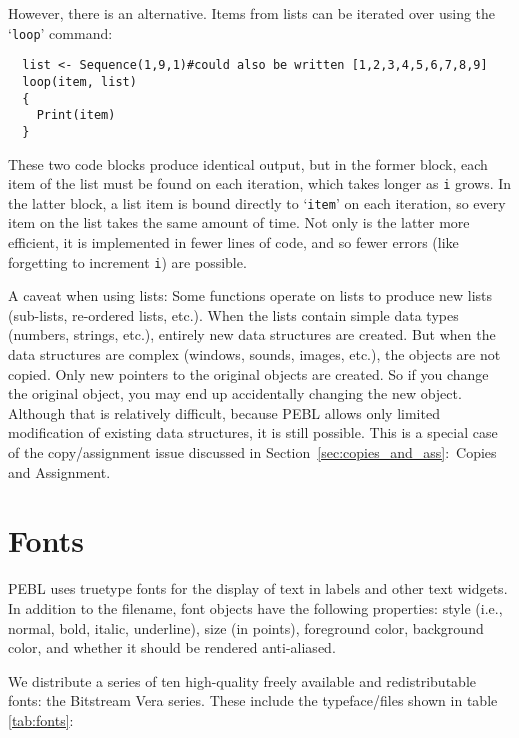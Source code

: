 However, there is an alternative.  Items from
lists can be iterated over using the `\texttt{loop}' command:  
\begin{verbatim}
  list <- Sequence(1,9,1)#could also be written [1,2,3,4,5,6,7,8,9]
  loop(item, list) 
  {
    Print(item)
  }
\end{verbatim}
These two code blocks produce identical output, but in the former block, each item of the list must be found on each iteration, which takes longer as \texttt{i} grows. In the latter block, a list item is bound directly to `\texttt{item}' on each iteration, so every item on the list takes the same amount of time. Not only is the latter more efficient, it is implemented in fewer lines of code, and so fewer errors (like forgetting to increment \texttt{i}) are possible.

A caveat when using lists: Some functions operate on lists to produce
new lists (sub-lists, re-ordered lists, etc.). When the lists contain
simple data types (numbers, strings, etc.), entirely new data
structures are created. But when the data structures are complex
(windows, sounds, images, etc.), the objects are not copied. Only new
pointers to the original objects are created. So if you change the
original object, you may end up accidentally changing the new
object. Although that is relatively difficult, because PEBL allows
only limited modification of existing data structures, it is still
possible. This is a special case of the copy/assignment issue
discussed in Section~\ref{sec:copies_and_ass}:~Copies and Assignment.




\section{Fonts}

PEBL uses truetype fonts for the display of text in labels and other text
widgets.  In addition to the filename, font objects have the following properties: style (i.e., normal, bold, italic, underline), size (in points),
foreground color, background color, and whether it should be rendered
anti-aliased.

We distribute a series of ten high-quality freely available
and redistributable fonts: the Bitstream Vera series.  These include
the typeface/files shown in table \ref{tab:fonts}:

